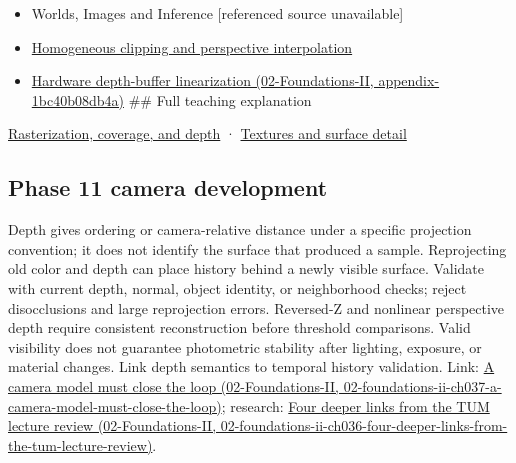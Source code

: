 \begin{itemize}
\item
  {Worlds, Images and Inference {[}referenced source unavailable{]}}
\item
  \hyperref[appendix-40426e4b2103]{Homogeneous clipping and perspective interpolation}
\item
  \href{../02-Foundations-II/main.pdf\#nameddest=appendix-1bc40b08db4a}{Hardware depth-buffer linearization (02-Foundations-II, appendix-1bc40b08db4a)} \#\# Full teaching explanation
\end{itemize}

\hyperref[03-visual-computing-i-ch012-rasterization-coverage-and-depth]{Rasterization, coverage, and depth} · \hyperref[03-visual-computing-i-ch019-textures-and-surface-detail]{Textures and surface detail}

\subsection{Phase 11 camera development}\label{appendix-97578ed97952-phase-11-camera-development}

Depth gives ordering or camera-relative distance under a specific projection convention; it does not identify the surface that produced a sample. Reprojecting old color and depth can place history behind a newly visible surface. Validate with current depth, normal, object identity, or neighborhood checks; reject disocclusions and large reprojection errors. Reversed-Z and nonlinear perspective depth require consistent reconstruction before threshold comparisons. Valid visibility does not guarantee photometric stability after lighting, exposure, or material changes. Link depth semantics to temporal history validation. Link: \href{../02-Foundations-II/main.pdf\#nameddest=02-foundations-ii-ch037-a-camera-model-must-close-the-loop}{A camera model must close the loop (02-Foundations-II, 02-foundations-ii-ch037-a-camera-model-must-close-the-loop)}; research: \href{../02-Foundations-II/main.pdf\#nameddest=02-foundations-ii-ch036-four-deeper-links-from-the-tum-lecture-review}{Four deeper links from the TUM lecture review (02-Foundations-II, 02-foundations-ii-ch036-four-deeper-links-from-the-tum-lecture-review)}.
